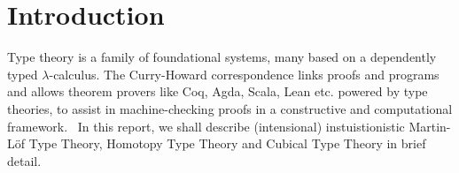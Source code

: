 \section{Introduction}
Type theory is a family of foundational systems, many based on a dependently typed $\lambda$-calculus.
The Curry-Howard correspondence links proofs and programs and allows theorem provers like
Coq, Agda, Scala, Lean etc. powered by type theories, to assist in machine-checking proofs
in a constructive and computational framework.~\cite{howard1995formulae}
In this report, we shall describe (intensional) instuistionistic Martin-L\"of Type Theory, Homotopy Type Theory and Cubical Type Theory in brief detail. 
